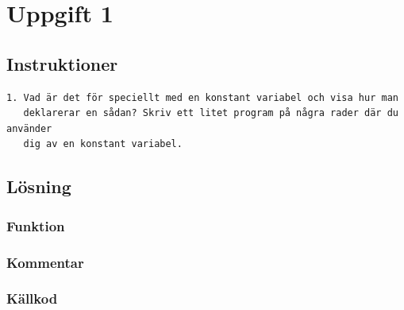 \section{Uppgift 1}\label{sec:uppg01}

\subsection{Instruktioner}
\begin{verbatim}
1. Vad är det för speciellt med en konstant variabel och visa hur man
   deklarerar en sådan? Skriv ett litet program på några rader där du använder
   dig av en konstant variabel.
\end{verbatim}


\subsection{Lösning}
\subsubsection{Funktion}

\subsubsection{Kommentar}




\subsubsection{Källkod}
\label{src:uppg01}


